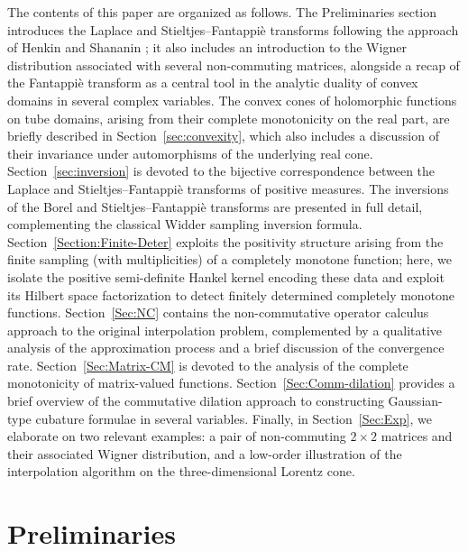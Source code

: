 \documentclass[11pt,reqno]{amsart}
\theoremstyle{plain}
\theoremstyle{definition}
\numberwithin{equation}{section}
\begin{document}
 The contents of this paper are organized as follows. The Preliminaries section introduces the Laplace and Stieltjes–Fantappi\`e transforms following the approach of Henkin and Shananin \cite{HS}; it also includes an introduction to the Wigner distribution associated with several non-commuting matrices, alongside a recap of the Fantappi\`e transform as a central tool in the analytic duality of convex domains in several complex variables. The convex cones of holomorphic functions on tube domains, arising from their complete monotonicity on the real part, are briefly described in Section~\ref{sec:convexity}, which also includes a discussion of their invariance under automorphisms of the underlying real cone. Section~\ref{sec:inversion} is devoted to the bijective correspondence between the Laplace and Stieltjes–Fantappi\`e transforms of positive measures. The inversions of the Borel and Stieltjes–Fantappi\`e transforms are presented in full detail, complementing the classical Widder sampling inversion formula. Section~\ref{Section:Finite-Deter} exploits the positivity structure arising from the finite sampling (with multiplicities) of a completely monotone function; here, we isolate the positive semi-definite Hankel kernel encoding these data and exploit its Hilbert space factorization to detect finitely determined completely monotone functions. Section~\ref{Sec:NC} contains the non-commutative operator calculus approach to the original interpolation problem, complemented by a qualitative analysis of the approximation process and a brief discussion of the convergence rate. Section~\ref{Sec:Matrix-CM} is devoted to the analysis of the complete monotonicity of matrix-valued functions. Section~\ref{Sec:Comm-dilation} provides a brief overview of the commutative dilation approach to constructing Gaussian-type cubature formulae in several variables. Finally, in Section~\ref{Sec:Exp}, we elaborate on two relevant examples: a pair of non-commuting $2 \times 2$ matrices and their associated Wigner distribution, and a low-order illustration of the interpolation algorithm on the three-dimensional Lorentz cone.


	\section{Preliminaries}
\end{document}
